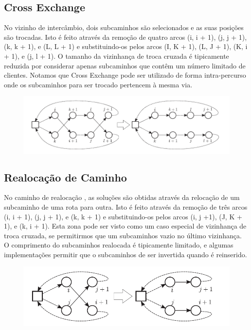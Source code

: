\subsection{Cross Exchange}

 No vizinho de intercâmbio, dois subcaminhos são selecionados e as suas posições são trocadas. Isto é feito através da remoção de quatro arcos (i, i + 1), (j, j + 1), (k, k + 1), e (L, L + 1) e substituindo-os pelos arcos (I, K + 1), (L, J + 1), (K, i + 1), e (j, l + 1). O tamanho da vizinhança de troca cruzada é tipicamente reduzida por considerar apenas subcaminhos que contêm um número limitado de clientes. Notamos que Cross Exchange pode ser utilizado de forma intra-percurso onde os subcaminhos para ser trocado pertencem à mesma via.
 
\begin{figure}[ht!]
\centering
\includegraphics[scale=0.8]{figuras/opt-4.PNG}
\label{opt-4}
\end{figure}
 
\subsection{Realocação de Caminho}
 No caminho de realocação , as soluções são obtidas através da relocação de um subcaminho de uma rota para outra. Isto é feito através da remoção de três arcos (i, i + 1), (j, j + 1), e (k, k + 1) e substituindo-os pelos arcos (i, j +1), (J, K + 1), e (k, i + 1). Esta zona pode ser visto como um caso especial de vizinhança de troca cruzada, se permitirmos que um subcaminhos vazio no último vizinhança. O comprimento do subcaminhos realocada é tipicamente limitado, e algumas implementações permitir que o subcaminhos de ser invertida quando é reinserido. 
 
\begin{figure}[ht!]
\centering
\includegraphics[scale=0.8]{figuras/opt-3.PNG}
\label{opt-5}
\end{figure}
 
